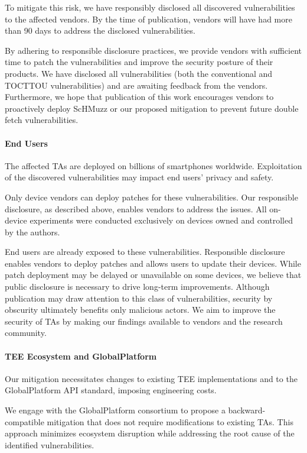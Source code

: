 \documentclass[conference]{IEEEtran} %
\newcommand{\sysname}{ScHMuzz\xspace}
\begin{document}
To mitigate this risk, we have responsibly disclosed all
discovered vulnerabilities to the affected vendors. By the time of publication,
vendors will have had more than 90 days to address the disclosed vulnerabilities.

By adhering to responsible disclosure practices, we provide
vendors with sufficient time to patch the vulnerabilities and improve the
security posture of their products. We have disclosed all vulnerabilities (both 
the conventional and TOCTTOU vulnerabilities) 
and are awaiting feedback from the vendors. Furthermore, we hope
that publication of this work encourages vendors to proactively deploy \sysname
or our proposed mitigation to prevent future double fetch vulnerabilities.

\paragraph{End Users}
The affected TAs are deployed on billions of smartphones worldwide.
Exploitation of the discovered vulnerabilities may impact end users' privacy
and safety.

Only device vendors can deploy patches for these
vulnerabilities. Our responsible disclosure, as described above, enables vendors
to address the issues. All on-device experiments were conducted
exclusively on devices owned and controlled by the authors.

End users are already exposed to these vulnerabilities.
Responsible disclosure enables vendors to deploy patches and allows users to
update their devices. While patch deployment may be delayed or unavailable on
some devices, we believe that public disclosure is necessary to drive long-term
improvements. Although publication may draw attention to
this class of vulnerabilities, security by obscurity ultimately benefits only
malicious actors. We aim to improve the security of TAs by making our findings
available to vendors and the research community.

\paragraph{TEE Ecosystem and GlobalPlatform}
Our mitigation necessitates changes to existing TEE implementations
and to the GlobalPlatform API standard, imposing engineering costs.

We engage with the GlobalPlatform consortium to propose a
backward-compatible mitigation that does not require modifications to existing
TAs. This approach minimizes ecosystem disruption while addressing the root cause
of the identified vulnerabilities.
\end{document}
